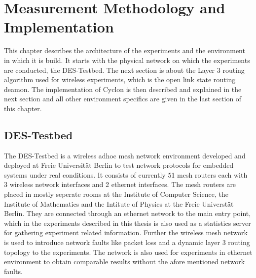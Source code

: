 \chapter{Measurement Methodology and Implementation} 
\label{chap:methodology}
This chapter describes the architecture of the experiments and the environment
in which it is build. It starts with the physical network on which the
experiments are conducted, the DES-Testbed. The next section is about the Layer
3 routing algorithm used for wireless experiments, which is the open link state
routing deamon. The implementation of Cyclon is then described and
explained in the next section and all other environment specifics are given in
the last section of this chapter.

\section{DES-Testbed}
The DES-Testbed is a wireless adhoc mesh network environment developed and
deployed at Freie Universität Berlin to test network protocols for embedded
systems under real conditions. It consists of currently 51 mesh routers each
with 3 wireless network interfaces and 2 ethernet interfaces. The mesh routers
are placed in mostly seperate rooms at the Institute of Computer Science, the
Institute of Mathematics and the Intitute of Physics at the Freie Universtät
Berlin. They are connected through an ethernet network to the main entry point,
which in the experiments described in this thesis is also used as a statistics
server for gathering experiment related information. Further the wireless mesh
network is used to introduce network faults like packet loss and a
dynamic layer 3 routing topology to the experiments. The network is also used
for experiments in ethernet environment to obtain comparable results without the
afore mentioned network faults.
%

